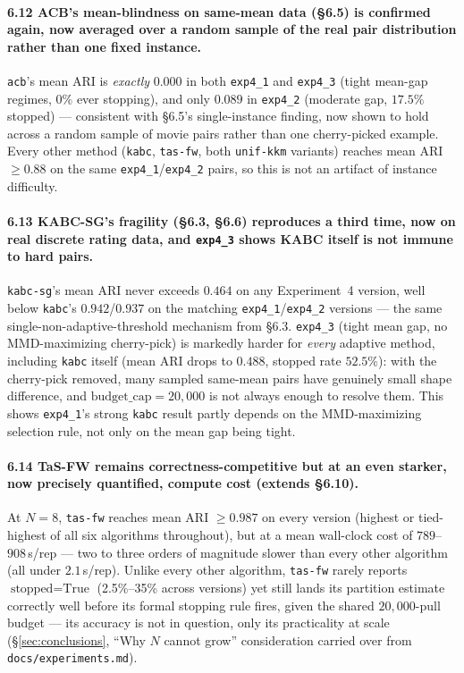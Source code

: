 \documentclass[11pt]{article}
\begin{document}
\paragraph{6.12 ACB's mean-blindness on same-mean data (\S6.5) is confirmed
again, now averaged over a random sample of the real pair distribution
rather than one fixed instance.} \texttt{acb}'s mean ARI is \emph{exactly}
$0.000$ in both \texttt{exp4\_1} and \texttt{exp4\_3} (tight mean-gap
regimes, $0\%$ ever stopping), and only $0.089$ in \texttt{exp4\_2}
(moderate gap, $17.5\%$ stopped) --- consistent with \S6.5's single-instance
finding, now shown to hold across a random sample of movie pairs rather than
one cherry-picked example. Every other method (\texttt{kabc},
\texttt{tas-fw}, both \texttt{unif-kkm} variants) reaches mean ARI $\ge
0.88$ on the same \texttt{exp4\_1}/\texttt{exp4\_2} pairs, so this is not an
artifact of instance difficulty.

\paragraph{6.13 KABC-SG's fragility (\S6.3, \S6.6) reproduces a third time,
now on real discrete rating data, and \texttt{exp4\_3} shows KABC itself is
not immune to hard pairs.} \texttt{kabc-sg}'s mean ARI never exceeds $0.464$
on any Experiment~4 version, well below \texttt{kabc}'s $0.942$/$0.937$ on
the matching \texttt{exp4\_1}/\texttt{exp4\_2} versions --- the same
single-non-adaptive-threshold mechanism from \S6.3. \texttt{exp4\_3} (tight
mean gap, no MMD-maximizing cherry-pick) is markedly harder for
\emph{every} adaptive method, including \texttt{kabc} itself (mean ARI
drops to $0.488$, stopped rate $52.5\%$): with the cherry-pick removed, many
sampled same-mean pairs have genuinely small shape difference, and
$\text{budget\_cap}=20{,}000$ is not always enough to resolve them. This
shows \texttt{exp4\_1}'s strong \texttt{kabc} result partly depends on the
MMD-maximizing selection rule, not only on the mean gap being tight.

\paragraph{6.14 TaS-FW remains correctness-competitive but at an even
starker, now precisely quantified, compute cost (extends \S6.10).} At
$N=8$, \texttt{tas-fw} reaches mean ARI $\ge 0.987$ on every version
(highest or tied-highest of all six algorithms throughout), but at a mean
wall-clock cost of $789$--$908$\,s/rep --- two to three orders of magnitude
slower than every other algorithm (all under $2.1$\,s/rep). Unlike every
other algorithm, \texttt{tas-fw} rarely reports $\text{stopped}=\text{True}$
(2.5\%--35\% across versions) yet still lands its partition estimate
correctly well before its formal stopping rule fires, given the shared
$20{,}000$-pull budget --- its accuracy is not in question, only its
practicality at scale (\S\ref{sec:conclusions}, ``Why $N$ cannot grow''
consideration carried over from \texttt{docs/experiments.md}).
\end{document}
